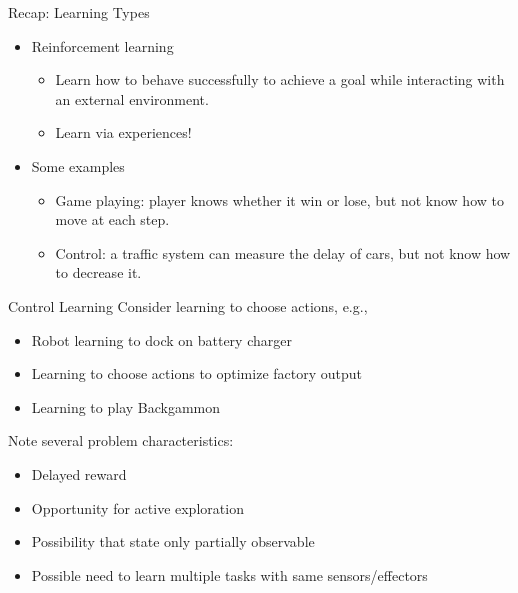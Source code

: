 \documentclass[%
pdf,
colorBG,
slideColor,
tcrico,
]{prosper}
\begin{document}
\begin{slide}{Recap: Learning Types} 
\begin{itemize}
\item Reinforcement learning
  \begin{itemize}
   \item Learn how to behave successfully to achieve a goal while interacting with an external environment. 
    \item Learn via experiences!
  \end{itemize}
\item Some examples
  \begin{itemize}
   \item Game playing: player knows whether it win or lose, but not know how to move at each step.
  \item Control: a traffic system can measure the delay of cars, but not know how to decrease it.
  \end{itemize}
\end{itemize}
\end{slide}




\begin{slide}{Control Learning } 
\tiny
Consider learning to choose actions, e.g.,

\begin{itemize}
\item Robot learning to dock on battery charger
\item Learning to choose actions to optimize factory output
\item Learning to play Backgammon
\end{itemize}

Note several problem characteristics:
\begin{itemize}
\item Delayed reward
\item Opportunity for active exploration
\item Possibility that state only partially observable
\item Possible need to learn multiple tasks with same sensors/effectors
\end{itemize}
\end{slide}
\end{document}
